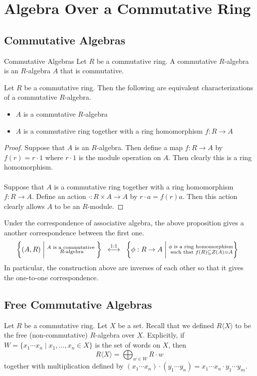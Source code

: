 \documentclass[a4paper]{article}
\begin{document}
\pagebreak
\section{Algebra Over a Commutative Ring}
\subsection{Commutative Algebras}
\begin{defn}{Commutative Algebras}{} Let $R$ be a commutative ring. A commutative $R$-algebra is an $R$-algebra $A$ that is commutative. 
\end{defn}

\begin{prp}{}{} Let $R$ be a commutative ring. Then the following are equivalent characterizations of a commutative $R$-algebra. 
\begin{itemize}
\item $A$ is a commutative $R$-algebra
\item $A$ is a commutative ring together with a ring homomorphism $f:R\to A$
\end{itemize}
\begin{proof}
Suppose that $A$ is an $R$-algebra. Then define a map $f:R\to A$ by $f(r)=r\cdot 1$ where $r\cdot 1$ is the module operation on $A$. Then clearly this is a ring homomorphism. \\~\\
Suppose that $A$ is a commutative ring together with a ring homomorphism $f:R\to A$. Define an action $\cdot:R\times A\to A$ by $r\cdot a=f(r)a$. Then this action clearly allows $A$ to be an $R$-module. 
\end{proof}
\end{prp}

Under the correspondence of associative algebra, the above proposition gives a another correspondence between the first one. $$\left\{(A,R)\;\bigg{|}\;\substack{A\text{ is a commutative }\\R\text{-algebra}}\right\}\;\;\overset{1:1}{\longleftrightarrow}\;\;\left\{\phi:R\to A\;\bigg{|}\;\substack{\phi\text{ is a ring homomorphism}\\\text{ such that }f(R)\subseteq Z(A)=A}\right\}\;\;$$ In particular, the construction above are inverses of each other so that it gives the one-to-one correspondence. 

\subsection{Free Commutative Algebras}
Let $R$ be a commutative ring. Let $X$ be a set. Recall that we defined $R\langle X\rangle$ to be the free (non-commutative) $R$-algebra over $X$. Explicitly, if $W=\{x_1\cdots x_n\;|\;x_1,\dots,x_n\in X\}$ is the set of words on $X$, then $$R\langle X\rangle=\bigoplus_{w\in W}R\cdot w$$ together with multiplication defined by $(x_1\cdots x_n)\cdot(y_1\cdots y_n)=x_1\cdots x_n\cdot y_1\cdots y_m$. 
\end{document}
